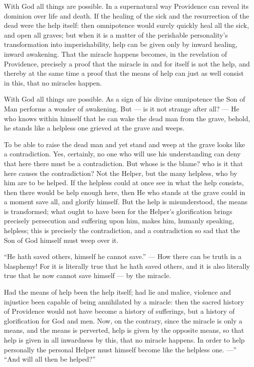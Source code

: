 \documentclass[12pt,a4paper,openany]{book}
\newcommand{\opage}[1]{\marginnote{\footnotesize\textit{[#1]}}}
\begin{document}
With God all things are possible. In a supernatural
way Providence can reveal its
dominion over life and death. If the
\setcounter{footnote}{0}%
\opage{46}healing of the sick and the resurrection of the dead
were the help itself: then omnipotence would surely quickly
heal all the sick, and open all graves; but
when it is a matter of the perishable personality's
transformation into imperishability, help can
be given only by inward healing, inward
awakening. That the miracle happens becomes, in
the revelation of Providence, precisely a proof that
the miracle in and for itself is not the help, and thereby
at the same time a proof that the means of help can just as well
consist in this, that no miracles happen.

With God all things are possible. As a sign
of his divine omnipotence the Son of Man
performs a wonder of awakening. But
--- is it not strange after all? --- He who
knows within himself that he can wake the dead man
from the grave, behold, he stands like a helpless one
grieved at the grave and weeps.

To be able to raise the dead man and yet stand
and weep at the grave looks like a contradiction. Yes, certainly, no one who will use his
understanding can deny that here there must be
a contradiction. But whose is the blame? who
is it that here causes the contradiction? Not
the Helper, but the many helpless, who by
\setcounter{footnote}{0}%
\opage{47}him are to be helped. If the helpless
could at once see in what the help consists, then
there would be help enough here, then He who stands
at the grave could in a moment save all, and glorify
himself. But the help is misunderstood,
the means is transformed; what ought to have been for
the Helper's glorification brings precisely persecution
and suffering upon him, makes him, humanly
speaking, helpless; this is precisely the contradiction,
and a contradiction so sad that
the Son of God himself must weep over it.

``He hath saved others, himself he cannot
save.'' --- How there can be truth
in a blasphemy! For it is literally
true that he hath saved others, and it is
also literally true that he now cannot
save himself --- by the miracle.

Had the means of help been the help itself;
had lie and malice, violence and injustice
been capable of being annihilated by a miracle: then the
sacred history of Providence would not have become a history of
sufferings, but a history of glorification
for God and men. Now, on the contrary, since the miracle
is only a means, and the means is perverted,
help is given by the opposite means, so that
\setcounter{footnote}{0}%
\opage{48}help is given in all inwardness by this, that
no miracle happens. In order to help personally
the personal Helper must himself become
like the helpless one. ---'' ``And will all then
be helped?''
\end{document}
